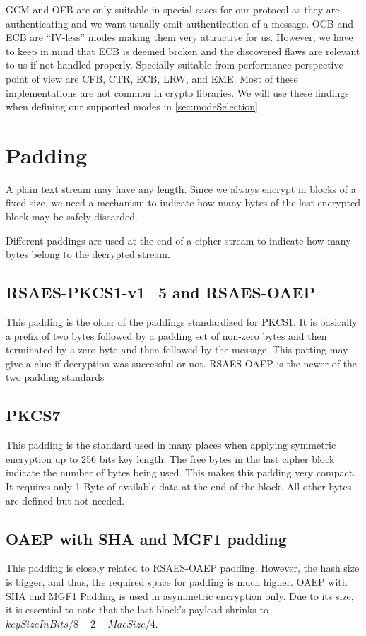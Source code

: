 GCM and OFB are only suitable in special cases for our protocol as they are authenticating and we want usually omit authentication of a message.  OCB and ECB are ``IV-less'' modes making them very attractive for us. However, we have to keep in mind that ECB is deemed broken and the discovered flaws are relevant to us if not handled properly. Specially suitable from performance perspective point of view are CFB, CTR, ECB, LRW, and EME. Most of these implementations are not common in crypto libraries. We will use these findings when defining our supported modes in \cref{sec:modeSelection}.

\section{Padding}
A plain text stream may have any length. Since we always encrypt in blocks of a fixed size, we need a mechanism to indicate how many bytes of the last encrypted block may be safely discarded. 

Different paddings are used at the end of a cipher stream to indicate how many bytes belong to the decrypted stream.

\subsection{RSAES-PKCS1-v1\_5 and RSAES-OAEP}
This padding is the older of the paddings standardized for PKCS1. It is basically a prefix of two bytes followed by a padding set of non-zero bytes and then terminated by a zero byte and then followed by the message. This patting may give a clue if decryption was successful or not. RSAES-OAEP is the newer of the two padding standards 

\subsection{PKCS7} 
This padding is the standard used in many places when applying symmetric encryption up to 256 bits key length. The free bytes in the last cipher block indicate the number of bytes being used. This makes this padding very compact. It requires only 1 Byte of available data at the end of the block. All other bytes are defined but not needed.

\subsection{OAEP with SHA and MGF1 padding} 
This padding is closely related to RSAES-OAEP padding. However, the hash size is bigger, and thus, the required space for padding is much higher. OAEP with SHA and MGF1 Padding is used in asymmetric encryption only. Due to its size, it is essential to note that the last block's payload shrinks to $keySizeInBits/8-2-MacSize/4$.

